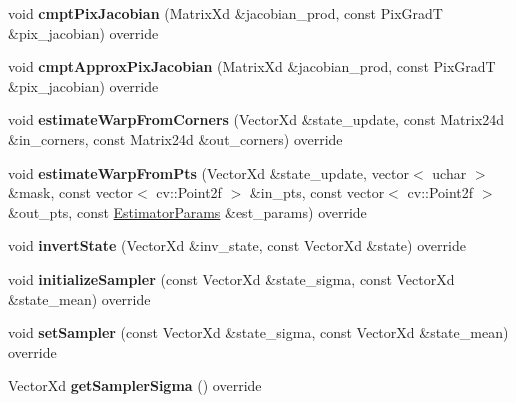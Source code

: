 \begin{DoxyCompactItemize}
\item 
\hypertarget{classSL3_afb4fcccbe2241f4882ad43df355adc4e}{void {\bfseries cmpt\-Pix\-Jacobian} (Matrix\-Xd \&jacobian\-\_\-prod, const Pix\-Grad\-T \&pix\-\_\-jacobian) override}\label{classSL3_afb4fcccbe2241f4882ad43df355adc4e}

\item 
\hypertarget{classSL3_af491365ccb344ac71ad536ac8744cb60}{void {\bfseries cmpt\-Approx\-Pix\-Jacobian} (Matrix\-Xd \&jacobian\-\_\-prod, const Pix\-Grad\-T \&pix\-\_\-jacobian) override}\label{classSL3_af491365ccb344ac71ad536ac8744cb60}

\item 
\hypertarget{classSL3_aab895be236039504afcd223d4f26ae52}{void {\bfseries estimate\-Warp\-From\-Corners} (Vector\-Xd \&state\-\_\-update, const Matrix24d \&in\-\_\-corners, const Matrix24d \&out\-\_\-corners) override}\label{classSL3_aab895be236039504afcd223d4f26ae52}

\item 
\hypertarget{classSL3_aa448362386adae45b0046f41cd421d9d}{void {\bfseries estimate\-Warp\-From\-Pts} (Vector\-Xd \&state\-\_\-update, vector$<$ uchar $>$ \&mask, const vector$<$ cv\-::\-Point2f $>$ \&in\-\_\-pts, const vector$<$ cv\-::\-Point2f $>$ \&out\-\_\-pts, const \hyperlink{structSSMEstimatorParams}{Estimator\-Params} \&est\-\_\-params) override}\label{classSL3_aa448362386adae45b0046f41cd421d9d}

\item 
\hypertarget{classSL3_ad643007f3d66aa8b5bdcf2df5dc590a1}{void {\bfseries invert\-State} (Vector\-Xd \&inv\-\_\-state, const Vector\-Xd \&state) override}\label{classSL3_ad643007f3d66aa8b5bdcf2df5dc590a1}

\item 
\hypertarget{classSL3_a11a26a3ae6742a6ce9f98c97e4cd9737}{void {\bfseries initialize\-Sampler} (const Vector\-Xd \&state\-\_\-sigma, const Vector\-Xd \&state\-\_\-mean) override}\label{classSL3_a11a26a3ae6742a6ce9f98c97e4cd9737}

\item 
\hypertarget{classSL3_aea43692ac3934f5bf3df8233635deb33}{void {\bfseries set\-Sampler} (const Vector\-Xd \&state\-\_\-sigma, const Vector\-Xd \&state\-\_\-mean) override}\label{classSL3_aea43692ac3934f5bf3df8233635deb33}

\item 
\hypertarget{classSL3_ac8ee7f8c65d0fff63b050cb188e44b0e}{Vector\-Xd {\bfseries get\-Sampler\-Sigma} () override}\label{classSL3_ac8ee7f8c65d0fff63b050cb188e44b0e}


\end{DoxyCompactItemize}
